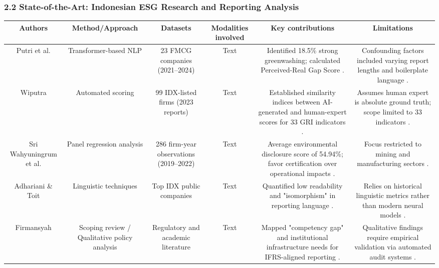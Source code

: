 \documentclass{article}
\begin{document}
\subsubsection{2.2 State-of-the-Art: Indonesian ESG Research and Reporting Analysis}
\begin{table}[h!]
\centering
\begin{tabular}{|c|c|c|c|c|c|}
\hline
Authors & Method/Approach & Datasets & Modalities involved & Key contributions & Limitations \\ \hline
Putri et al.  \parencite{anisa_kusuma_putri_4109a23b} & Transformer-based NLP & 23 FMCG companies (2021–2024) & Text & Identified 18.5\% strong greenwashing; calculated Perceived-Real Gap Score  \parencite{anisa_kusuma_putri_4109a23b}. & Confounding factors included varying report lengths and boilerplate language  \parencite{anisa_kusuma_putri_4109a23b}. \\ \hline
Wiputra  \parencite{richard_wiputra_699f6060} & Automated scoring & 99 IDX-listed firms (2023 reports) & Text & Established similarity indices between AI-generated and human-expert scores for 33 GRI indicators  \parencite{richard_wiputra_699f6060}. & Assumes human expert is absolute ground truth; scope limited to 33 indicators  \parencite{richard_wiputra_699f6060}. \\ \hline
Sri Wahyuningrum et al.  \parencite{indah_fajarini_sri_wahyuningrum_1ce983fb} & Panel regression analysis & 286 firm-year observations (2019–2022) & Text & Average environmental disclosure score of 54.94\%; favor certification over operational impacts  \parencite{indah_fajarini_sri_wahyuningrum_1ce983fb}. & Focus restricted to mining and manufacturing sectors  \parencite{indah_fajarini_sri_wahyuningrum_1ce983fb}. \\ \hline
Adhariani \& Toit  \parencite{desi_adhariani_toit_543335d6} & Linguistic techniques & Top IDX public companies & Text & Quantified low readability and "isomorphism" in reporting language  \parencite{desi_adhariani_toit_543335d6}. & Relies on historical linguistic metrics rather than modern neural models  \parencite{desi_adhariani_toit_543335d6}. \\ \hline
Firmansyah  \parencite{amrie_firmansyah_fd5249a2} & Scoping review / Qualitative policy analysis & Regulatory and academic literature & Text & Mapped "competency gap" and institutional infrastructure needs for IFRS-aligned reporting  \parencite{amrie_firmansyah_fd5249a2}. & Qualitative findings require empirical validation via automated audit systems  \parencite{amrie_firmansyah_fd5249a2}. \\ \hline

\end{tabular}
\end{table}
\end{document}
